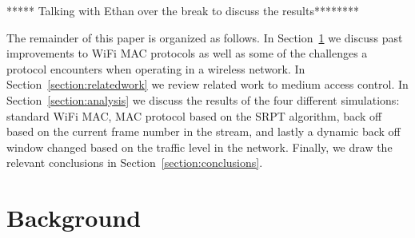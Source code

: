 \documentclass{sigcomm-alternate}
\begin{document}

***** Talking with Ethan over the break to discuss the results********

The remainder of this paper is organized as follows. In Section~\ref{section:background} we discuss past improvements to WiFi MAC protocols as well as some of the challenges a protocol encounters when operating in a wireless network. In Section~\ref{section:relatedwork} we review related work to medium access control. In Section~\ref{section:analysis} we discuss the results of the four different simulations: standard WiFi MAC, MAC protocol based on the SRPT algorithm, back off based on the current frame number in the stream, and lastly a dynamic back off window changed based on the traffic level in the network. Finally, we draw the relevant conclusions in Section~\ref{section:conclusions}.


%
%
%
%


\section{Background}
\label{section:background}

\end{document}
